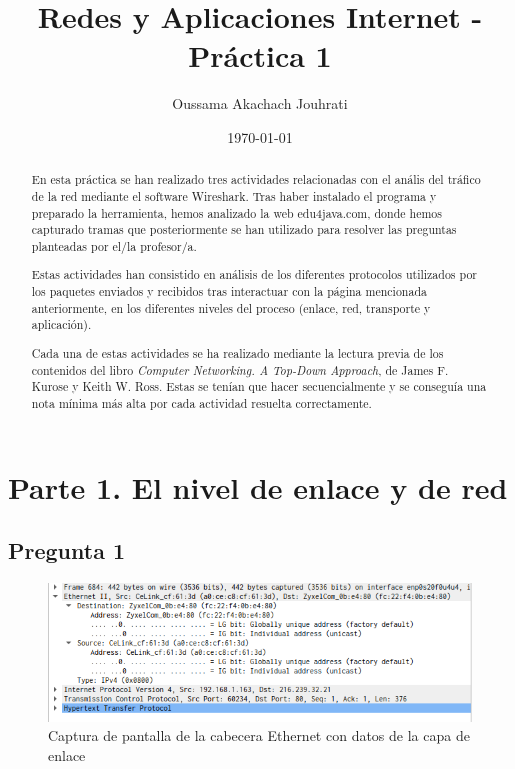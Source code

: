 \documentclass[spanish]{report} %
\title{Redes y Aplicaciones Internet - Práctica 1}
\author{Oussama Akachach Jouhrati} %
\date{\today}
\begin{document}
\maketitle
\tableofcontents
\setcounter{page}{2}

\begin{abstract}

En esta práctica se han realizado tres actividades relacionadas con el anális del
tráfico de la red mediante el software Wireshark. Tras haber instalado el
programa y preparado la herramienta, hemos analizado la web edu4java.com, donde
hemos capturado tramas que posteriormente se han utilizado para resolver las
preguntas planteadas por el/la profesor/a.\newline

Estas actividades han consistido en análisis de los diferentes protocolos
utilizados por los paquetes enviados y recibidos tras interactuar con la página
mencionada anteriormente, en los diferentes niveles del proceso (enlace, red,
transporte y aplicación).\newline

Cada una de estas actividades se ha realizado mediante la lectura previa de los
contenidos del libro \textit{Computer Networking. A Top-Down Approach}, de James
F. Kurose y Keith W. Ross. Estas se tenían que hacer secuencialmente y se
conseguía una nota mínima más alta por cada actividad resuelta correctamente.

\end{abstract}

\setcounter{page}{3}

\section{Parte 1. El nivel de enlace y de red}

\subsection{Pregunta 1}

\begin{figure}[h]
\begin{center}
\includegraphics[scale=.5]{../img/1.png}
\end{center}
\caption{Captura de pantalla de la cabecera Ethernet con datos de la capa de
enlace}
\end{figure}
\end{document}
